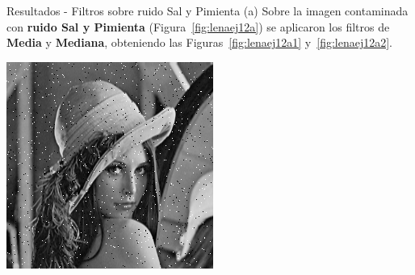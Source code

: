 \documentclass{beamer}
\begin{document}
\begin{frame}[fragile]{Resultados - Filtros sobre ruido Sal y Pimienta (a)}
	\justifying
	Sobre la imagen contaminada con \textcolor{unahurverde}{\textbf{ruido Sal y Pimienta}} (Figura~\ref{fig:lenaej12a})  
	se aplicaron los filtros de \textcolor{unahurverde}{\textbf{Media}} y \textcolor{unahurverde}{\textbf{Mediana}}, obteniendo las Figuras~\ref{fig:lenaej12a1} y~\ref{fig:lenaej12a2}.
	
	\vspace{0.5cm}
	\centering
	\begin{minipage}{0.32\linewidth}
		\centering
		\includegraphics[width=\linewidth]{../results/lena_ej12a}
		\label{fig:lenaej12a}
	\end{minipage}\hfill
	\begin{minipage}{0.32\linewidth}
		\centering

\end{minipage}
\end{frame}
\end{document}
